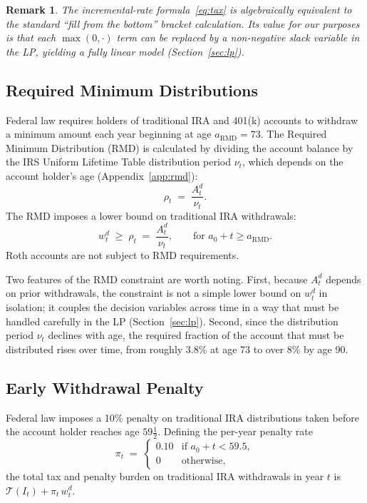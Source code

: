 \documentclass[12pt]{article}
\newtheorem{remark}{Remark}
\newcommand{\Tax}{\mathcal{T}}
\begin{document}
\begin{remark}
  The incremental-rate formula~\eqref{eq:tax} is algebraically equivalent to
  the standard ``fill from the bottom'' bracket calculation.  Its value for
  our purposes is that each $\max(0, \cdot)$ term can be replaced by a
  non-negative slack variable in the LP, yielding a fully linear model
  (Section~\ref{sec:lp}).
\end{remark}

\subsection{Required Minimum Distributions}
\label{sec:rmd}

Federal law requires holders of traditional IRA and 401(k) accounts to
withdraw a minimum amount each year beginning at age $a_{\mathrm{RMD}} = 73$.
The Required Minimum Distribution (RMD) is calculated by dividing the
account balance by the IRS Uniform Lifetime Table distribution period $\nu_t$,
which depends on the account holder's age (Appendix~\ref{app:rmd}):
\begin{equation}
  \rho_t \;=\; \frac{A^d_t}{\nu_t}.
  \label{eq:rmd_amount}
\end{equation}
The RMD imposes a lower bound on traditional IRA withdrawals:
\begin{equation}
  w^d_t \;\geq\; \rho_t \;=\; \frac{A^d_t}{\nu_t},
  \qquad \text{for } a_0 + t \geq a_{\mathrm{RMD}}.
  \label{eq:rmd}
\end{equation}
Roth accounts are not subject to RMD requirements.

Two features of the RMD constraint are worth noting. First, because $A^d_t$
depends on prior withdrawals, the constraint is not a simple lower bound on
$w^d_t$ in isolation; it couples the decision variables across time in a way
that must be handled carefully in the LP (Section~\ref{sec:lp}). Second,
since the distribution period $\nu_t$ declines with age, the required
fraction of the account that must be distributed rises over time, from
roughly 3.8\% at age 73 to over 8\% by age 90.

\subsection{Early Withdrawal Penalty}
\label{sec:penalty}

Federal law imposes a 10\% penalty on traditional IRA distributions taken
before the account holder reaches age $59\tfrac{1}{2}$. Defining the
per-year penalty rate
\begin{equation}
  \pi_t \;=\; \begin{cases} 0.10 & \text{if } a_0 + t < 59.5, \\
                             0   & \text{otherwise,} \end{cases}
  \label{eq:penalty_rate}
\end{equation}
the total tax and penalty burden on traditional IRA withdrawals in year $t$
is $\Tax(I_t) + \pi_t\,w^d_t$.
\end{document}
